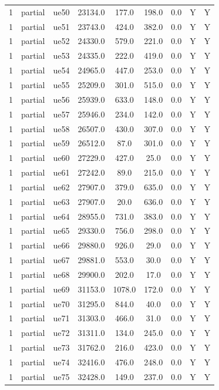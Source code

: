 \begin{table}[ht]
\begin{tabular}{|c|c|c|c|c|c|c|c|c|}
1 & partial & ue50 & 23134.0 & 177.0 & 198.0 & 0.0 & Y & Y \\
1 & partial & ue51 & 23743.0 & 424.0 & 382.0 & 0.0 & Y & Y \\
1 & partial & ue52 & 24330.0 & 579.0 & 221.0 & 0.0 & Y & Y \\
1 & partial & ue53 & 24335.0 & 222.0 & 419.0 & 0.0 & Y & Y \\
1 & partial & ue54 & 24965.0 & 447.0 & 253.0 & 0.0 & Y & Y \\
1 & partial & ue55 & 25209.0 & 301.0 & 515.0 & 0.0 & Y & Y \\
1 & partial & ue56 & 25939.0 & 633.0 & 148.0 & 0.0 & Y & Y \\
1 & partial & ue57 & 25946.0 & 234.0 & 142.0 & 0.0 & Y & Y \\
1 & partial & ue58 & 26507.0 & 430.0 & 307.0 & 0.0 & Y & Y \\
1 & partial & ue59 & 26512.0 & 87.0 & 301.0 & 0.0 & Y & Y \\
1 & partial & ue60 & 27229.0 & 427.0 & 25.0 & 0.0 & Y & Y \\
1 & partial & ue61 & 27242.0 & 89.0 & 215.0 & 0.0 & Y & Y \\
1 & partial & ue62 & 27907.0 & 379.0 & 635.0 & 0.0 & Y & Y \\
1 & partial & ue63 & 27907.0 & 20.0 & 636.0 & 0.0 & Y & Y \\
1 & partial & ue64 & 28955.0 & 731.0 & 383.0 & 0.0 & Y & Y \\
1 & partial & ue65 & 29330.0 & 756.0 & 298.0 & 0.0 & Y & Y \\
1 & partial & ue66 & 29880.0 & 926.0 & 29.0 & 0.0 & Y & Y \\
1 & partial & ue67 & 29881.0 & 553.0 & 30.0 & 0.0 & Y & Y \\
1 & partial & ue68 & 29900.0 & 202.0 & 17.0 & 0.0 & Y & Y \\
1 & partial & ue69 & 31153.0 & 1078.0 & 172.0 & 0.0 & Y & Y \\
1 & partial & ue70 & 31295.0 & 844.0 & 40.0 & 0.0 & Y & Y \\
1 & partial & ue71 & 31303.0 & 466.0 & 31.0 & 0.0 & Y & Y \\
1 & partial & ue72 & 31311.0 & 134.0 & 245.0 & 0.0 & Y & Y \\
1 & partial & ue73 & 31762.0 & 216.0 & 423.0 & 0.0 & Y & Y \\
1 & partial & ue74 & 32416.0 & 476.0 & 248.0 & 0.0 & Y & Y \\
1 & partial & ue75 & 32428.0 & 149.0 & 237.0 & 0.0 & Y & Y \\

\end{tabular}
\end{table}
